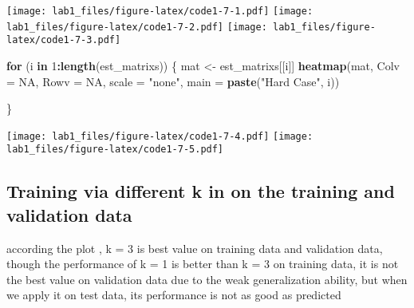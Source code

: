 \documentclass[
]{article}
\newenvironment{Shaded}{\begin{snugshade}}{\end{snugshade}}
\newcommand{\AttributeTok}[1]{\textcolor[rgb]{0.13,0.29,0.53}{#1}}
\newcommand{\ConstantTok}[1]{\textcolor[rgb]{0.56,0.35,0.01}{#1}}
\newcommand{\ControlFlowTok}[1]{\textcolor[rgb]{0.13,0.29,0.53}{\textbf{#1}}}
\newcommand{\DecValTok}[1]{\textcolor[rgb]{0.00,0.00,0.81}{#1}}
\newcommand{\FunctionTok}[1]{\textcolor[rgb]{0.13,0.29,0.53}{\textbf{#1}}}
\newcommand{\NormalTok}[1]{#1}
\newcommand{\OtherTok}[1]{\textcolor[rgb]{0.56,0.35,0.01}{#1}}
\newcommand{\SpecialCharTok}[1]{\textcolor[rgb]{0.81,0.36,0.00}{\textbf{#1}}}
\newcommand{\StringTok}[1]{\textcolor[rgb]{0.31,0.60,0.02}{#1}}
\begin{document}
\texttt{[image: lab1\_files/figure-latex/code1-7-1.pdf]}
\texttt{[image: lab1\_files/figure-latex/code1-7-2.pdf]}
\texttt{[image: lab1\_files/figure-latex/code1-7-3.pdf]}

\begin{Shaded}
\begin{Highlighting}[]
\ControlFlowTok{for}\NormalTok{ (i }\ControlFlowTok{in} \DecValTok{1}\SpecialCharTok{:}\FunctionTok{length}\NormalTok{(est\_matrixs)) \{}
\NormalTok{mat }\OtherTok{\textless{}{-}}\NormalTok{ est\_matrixs[[i]]}
\FunctionTok{heatmap}\NormalTok{(mat, }\AttributeTok{Colv =} \ConstantTok{NA}\NormalTok{, }\AttributeTok{Rowv =} \ConstantTok{NA}\NormalTok{, }\AttributeTok{scale =} \StringTok{"none"}\NormalTok{, }\AttributeTok{main =} \FunctionTok{paste}\NormalTok{(}\StringTok{"Hard Case"}\NormalTok{, i))}

\NormalTok{\}}
\end{Highlighting}
\end{Shaded}

\texttt{[image: lab1\_files/figure-latex/code1-7-4.pdf]}
\texttt{[image: lab1\_files/figure-latex/code1-7-5.pdf]}

\subsection{Training via different k in on the training and validation
data}\label{training-via-different-k-in-on-the-training-and-validation-data}

according the plot , k = 3 is best value on training data and validation
data, though the performance of k = 1 is better than k = 3 on training
data, it is not the best value on validation data due to the weak
generalization ability, but when we apply it on test data, its
performance is not as good as predicted
\end{document}
